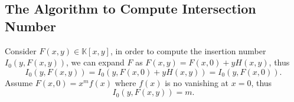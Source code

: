 \documentclass[10pt]{article}
\begin{document}
\subsection{The Algorithm to Compute Intersection Number}

Consider $ F(x,y) \in \mathbb{K}[x,y]$, in order to compute the insertion number $ I_{0}(y, F(x,y))$, we can expand $ F$ as $ F(x,y) = F(x,0) + y H(x,y)$, thus
\begin{equation*}
  I_0(y, F(x,y)) = I_0(y, F(x,0) + y H(x,y)) = I_0(y, F(x,0)).
\end{equation*}
Assume $ F(x,0) = x^{m} f(x)$ where $ f(x)$ is no vanishing at $ x=0$, thus
\begin{equation*}
  I_0(y, F(x,y)) = m.
\end{equation*}

\label{LastPage}
\end{document}
